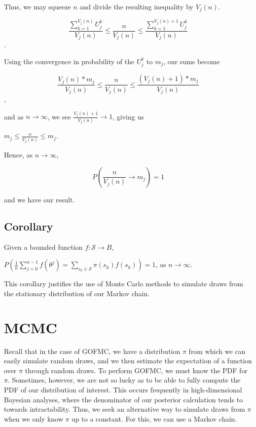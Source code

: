 \documentclass[12pt,twoside]{reedthesis}
\begin{document}
		Thus, we may squeeze $n$ and divide the resulting inequality by $V_j(n)$.
		\begin{center}
		$$\displaystyle\frac{\displaystyle\sum_{k=1}^{V_j(n)}U_j^k}{V_j(n)} \leq 
		\frac{n}{V_j(n)} \leq 
		\frac{\displaystyle\sum_{k=1}^{V_j(n) + 1}U_j^k}{V_j(n)}$$.
		\end{center}
		Using the convergence in probability of the $U_j^k$ to $m_j$, our sums become
		\begin{center}
		$$\displaystyle\frac{V_j(n) * m_j}{V_j(n)} \leq 
		\frac{n}{V_j(n)} \leq 
		\frac{(V_j(n)+1) * m_j}{V_j(n)}$$,
		\end{center}		
		 and as $n \rightarrow \infty$, we see $\frac{V_j(n) +1 }{V_j(n)} \rightarrow 1$, giving us
		 \begin{center}
		 	$ m_j \leq \displaystyle\frac{n}{V_j(n)} \leq m_j$.
		 \end{center}
		 Hence, as $n \rightarrow \infty$,
		 \begin{center}
		 $$
		 P\left( \displaystyle\frac{n}{V_j(n)} \longrightarrow {m_j} \right) = 1
		 $$
		 \end{center}
		 and we have our result.
		\subsection*{Corollary}
		Given a bounded function $f: \mathcal{S} \rightarrow B$,
		\begin{center}
			$P\left( \displaystyle \frac{1}{n} \sum_{j=0}^{n-1} f(\theta^{j}) 
			= \sum_{s_k \in \mathcal S} \pi(s_k) f(s_k) \right) = 1$, as $n \longrightarrow \infty$.
		\end{center}
		This corollary justifies the use of Monte Carlo methods to simulate draws from the stationary distribution of our Markov chain.
	\section{MCMC}
			Recall that in the case of GOFMC, we have a distribution $\pi$ from which we can easily simulate random draws, and we then estimate the expectation of a function over $\pi$ through random draws. To perform GOFMC, we must know the PDF for $\pi$. Sometimes, however, we are not so lucky as to be able to fully compute the PDF of our distribution of interest. This occurs frequently in high-dimensional Bayesian analyses, where the denominator of our posterior calculation tends to towards intractability. Thus, we seek an alternative way to simulate draws from $\pi$ when we only know $\pi$ up to a constant. For this, we can use a Markov chain.
\end{document}
